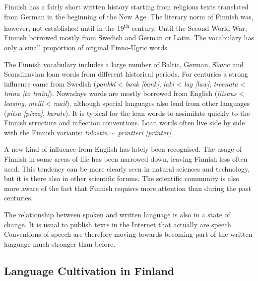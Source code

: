 \documentclass[]{../../metanetpaper}
\begin{document}
\begin{multicols}{2}
Finnish has a fairly short written history starting from religious texts
translated from German in the beginning of the New Age. The literary norm of
Finnish was, however, not established until in the 19\textsuperscript{th} century. Until the
Second World War, Finnish borrowed mostly from Swedish and German or Latin. The
vocabulary has only a small proportion of original Finno-Ugric words.

The Finnish vocabulary includes a large number of Baltic, German, Slavic and
Scandinavian loan words from different historical periods. For centuries a
strong influence came from Swedish
 ({\foreignlanguage{finnish}{\textit{pankki}}} < \textit{bank [bank]},
  {\foreignlanguage{finnish}{\textit{laki}}} < \textit{lag [law]},
  {\foreignlanguage{finnish}{\textit{treenata}}} < \textit{träna [to train]}).
Nowadays words are mostly borrowed from English
 ({\foreignlanguage{finnish}{\textit{liisaus}}} < \textit{leasing},
  {\foreignlanguage{finnish}{\textit{meili}}} < \textit{mail}),
although special languages also lend from
other languages
 (\textit{\foreignlanguage{finnish}{\textit{pitsa}} [pizza]},
  \textit{\foreignlanguage{finnish}{\textit{karate}}}).
It is typical for the loan words to
assimilate quickly to the Finnish structure and inflection conventions. Loan
words often live side by side with the Finnish variants:
\textit{\foreignlanguage{finnish}{\textit{tulostin}} $\sim$
        \foreignlanguage{finnish}{\textit{printteri}} [printer]}.

A new kind of influence from English has lately been recognised. The usage of
Finnish in some areas of life has been narrowed down, leaving Finnish less
often used. This tendency can be more clearly seen in natural sciences and
technology, but it is there also in other scientific forums. The scientific
community is also more aware of the fact that Finnish requires more attention
than during the past centuries.

The relationship between spoken and written language is also in a state of
change. It is usual to publish texts in the Internet that actually are speech.
Conventions of speech are therefore moving towards becoming part of the written
language much stronger than before.

\subsection{Language Cultivation in Finland}



\end{multicols}
\end{document}
